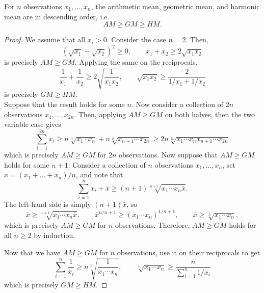 \documentclass[11pt]{article}
\theoremstyle{definition}
\theoremstyle{remark}
\numberwithin{equation}{section}
\begin{document}
    \begin{theorem}
        For $n$ observations $x_1, \dots, x_n$, the arithmetic mean, geometric mean,
        and harmonic mean are in descending order, i.e.\ \[
            AM \geq GM \geq HM.
        \] 
    \end{theorem}
    \begin{proof}
        We assume that all $x_i > 0$. Consider the case $n = 2$. Then, \[
            (\sqrt{x_1} - \sqrt{x_2})^2 \geq 0, \qquad x_1 + x_2 \geq 2\sqrt{x_1 x_2}
        \] is precisely $AM \geq GM$. Applying the same on the reciprocals, \[
            \frac{1}{x_1} + \frac{1}{x_2} \geq 2\sqrt{\frac{1}{x_1 x_2}}, \qquad
            \sqrt{x_1 x_2} \geq \frac{2}{1 / x_1 + 1 / x_2}
        \] is precisely $GM \geq HM$. \\

        Suppose that the result holds for some $n$. Now consider a collection of $2n$
        observations $x_1, \dots, x_{2n}$. Then, applying $AM \geq GM$ on both
        halves, then the two variable case gives \[
            \sum_{i = 1}^{2n} x_i \geq n\sqrt[n]{x_1\cdot x_n} + n\sqrt[n]{x_{n + 1}\cdots
            x_{2n}} \geq 2n\sqrt[2n]{x_1\cdots x_n x_{n + 1}\cdots x_{2n}}
        \] which is precisely $AM \geq GM$ for $2n$ observations.  Now suppose that
        $AM \geq GM$ holds for some $n + 1$. Consider a collection of $n$
        observations $x_1, \dots, x_n$, set $\bar{x} = (x_1 + \dots + x_n) / n$, and
        note that \[
            \sum_{i = 1}^n x_i + \bar{x} \geq (n + 1)\sqrt[n + 1]{x_1\cdots x_n
            \bar{x}}.
        \] The left-hand side is simply $(n + 1)\bar{x}$, so \[
            \bar{x} \geq \sqrt[n + 1]{x_1\cdots x_n \bar{x}}, \qquad \bar{x}^{n / n +
            1} \geq (x_1\cdots x_n)^{1 / n + 1}, \qquad \bar{x} \geq
            \sqrt[n]{x_1\cdots x_n},
        \] which is precisely $AM \geq GM$ for $n$ observations. Therefore, $AM \geq
        GM$ holds for all $n \geq 2$ by induction.

        Now that we have $AM \geq GM$ for $n$ observations, use it on their
        reciprocals to get \[
            \sum_{i = 1}^n \frac{1}{x_i} \geq n\sqrt[n]{\frac{1}{x_1\cdots x_n}}, \qquad 
            \sqrt[n]{x_1\cdots x_n} \geq \frac{n}{\sum_{i = 1}^n 1 / x_i}
        \] which is precisely $GM \geq HM$.
    \end{proof}
\end{document}
